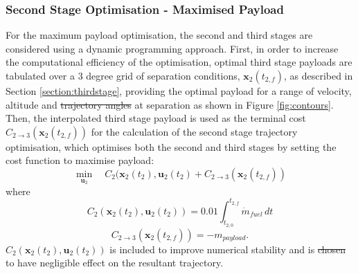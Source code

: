 \documentclass[journal]{new-aiaa}
\providecommand{\DIFadd}[1]{{\protect\color{blue}\uwave{#1}}} %
\providecommand{\DIFdel}[1]{{\protect\color{red}\sout{#1}}}                      %
\providecommand{\DIFaddbegin}{} %
\providecommand{\DIFaddend}{} %
\providecommand{\DIFdelbegin}{} %
\providecommand{\DIFdelend}{} %
\newcommand{\DIFscaledelfig}{0.5}
\newlength{\DIFdelgraphicswidth} %
\newlength{\DIFdelgraphicsheight} %
\newcommand{\DIFaddincludegraphics}[2][]{{\color{blue}\fbox{\DIFOincludegraphics[#1]{#2}}}} %
\newcommand{\DIFdelincludegraphics}[2][]{%
\sbox{\DIFdelgraphicsbox}{\DIFOincludegraphics[#1]{#2}}%
\settoboxwidth{\DIFdelgraphicswidth}{\DIFdelgraphicsbox} %
\settoboxtotalheight{\DIFdelgraphicsheight}{\DIFdelgraphicsbox} %
\scalebox{\DIFscaledelfig}{%
\parbox[b]{\DIFdelgraphicswidth}{\usebox{\DIFdelgraphicsbox}\\[-\baselineskip] \rule{\DIFdelgraphicswidth}{0em}}\llap{\resizebox{\DIFdelgraphicswidth}{\DIFdelgraphicsheight}{%
\setlength{\unitlength}{\DIFdelgraphicswidth}%
\begin{picture}(1,1)%
\thicklines\linethickness{2pt} %
{\color[rgb]{1,0,0}\put(0,0){\framebox(1,1){}}}%
{\color[rgb]{1,0,0}\put(0,0){\line( 1,1){1}}}%
{\color[rgb]{1,0,0}\put(0,1){\line(1,-1){1}}}%
\end{picture}%
}\hspace*{3pt}}} %
} %
\DeclareRobustCommand{\DIFaddbegin}{\DIFOaddbegin \let\includegraphics\DIFaddincludegraphics} %
\DeclareRobustCommand{\DIFaddend}{\DIFOaddend \let\includegraphics\DIFOincludegraphics} %
\DeclareRobustCommand{\DIFdelbegin}{\DIFOdelbegin \let\includegraphics\DIFdelincludegraphics} %
\DeclareRobustCommand{\DIFdelend}{\DIFOaddend \let\includegraphics\DIFOincludegraphics} %
\begin{document}
	\DIFaddbegin \DIFadd{\textcolor{red}{In order to ensure an optimal solution, the number of nodes which DIDO uses is manually varied between 96-105, and a solution computed for each node value to ensure a distinct local minima. Ten solutions is observed to provide a sufficient number of node variation, with the solutions converging to similar local minima. The range of node values is chosen to produce accurate solutions, with efficient computation times. The final solution chosen corresponds to the node value which most minimises the cost function, and thus minimises the deviation from the 50kPa dynamic pressure trajectory. }
	 	 }

	 	 \DIFaddend \subsubsection{Second Stage Optimisation - Maximised Payload}
	 For the maximum payload optimisation, the second and third stages are considered using a dynamic programming approach. First, in order to increase the computational efficiency of the optimisation, optimal third stage payloads are tabulated  over a 3 degree grid of separation conditions, $\textbf{x}_2(t_{2,f})$, as described in Section \ref{section:thirdstage}, providing the optimal payload for a range of velocity, altitude and \DIFdelbegin \DIFdel{trajectory angles }\DIFdelend \DIFaddbegin \DIFadd{\textcolor{red}{flight path angle}s }\DIFaddend at separation as shown in Figure \ref{fig:contours}. Then, the interpolated third stage payload is used as the terminal cost $C_{2 \rightarrow 3}(\textbf{x}_2(t_{2,f}))$ for the calculation of the second stage trajectory optimisation, which optimises both the second and third stages by setting the cost function to maximise payload:
	  \begin{equation}
	  \min\limits_{\textbf{u}_2} \quad C_2(\textbf{x}_{2}(t_2),\textbf{u}_{2}(t_2) + C_{2 \rightarrow 3}(\textbf{x}_2 (t_{2,f}))
	  \end{equation}
	  where
	  \begin{equation}
	  C_2(\textbf{x}_{2}(t_2),\textbf{u}_{2}(t_2)) = 0.01\int_{t_{2,0}}^{t_{2,f}}\dot{m}_{fuel} \, dt
	  \end{equation}
	  \begin{equation}
	  C_{2 \rightarrow 3}(\textbf{x}_2(t_{2,f})) = -m_{payload}.
	  \end{equation}
	   $C_{2}(\textbf{x}_{2}(t_2),\textbf{u}_{2}(t_2))$ is included to improve numerical stability and is \DIFdelbegin \DIFdel{chosen }\DIFdelend \DIFaddbegin \DIFadd{\textcolor{red}{weighted by a constant, 0.01, in order} }\DIFaddend to have negligible effect on the resultant trajectory.
\end{document}
